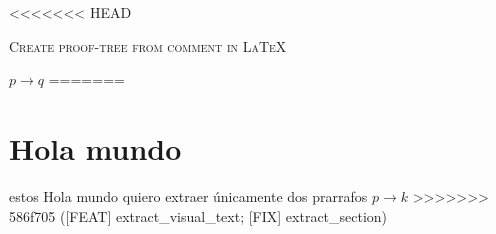 \documentclass{article}
\begin{document}
\pagestyle{empty}
\enlargethispage{100cm}

<<<<<<< HEAD
\begin{center}
	\Large
	\scshape
	Create proof-tree from comment in \LaTeX
\end{center}

$p \to q$ 
=======
\section{Hola mundo}
estos 
Hola mundo quiero extraer únicamente 
dos 
prarrafos
$p \to k$ 
>>>>>>> 586f705 ([FEAT] extract_visual_text; [FIX] extract_section)
\end{document}
